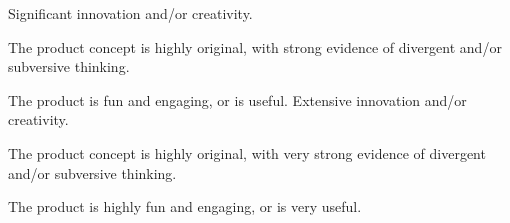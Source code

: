 \documentclass{../../fal_assignment}
\begin{document}
\begin{markingrubric}
        \grade Significant innovation and/or creativity.
            \par The product concept is highly original, with strong evidence of divergent and/or subversive thinking.
            \par The product is fun and engaging, or is useful.
        \grade Extensive innovation and/or creativity.
            \par The product concept is highly original, with very strong evidence of divergent and/or subversive thinking.
            \par The product is highly fun and engaging, or is very useful.
\end{markingrubric}
\end{document}
